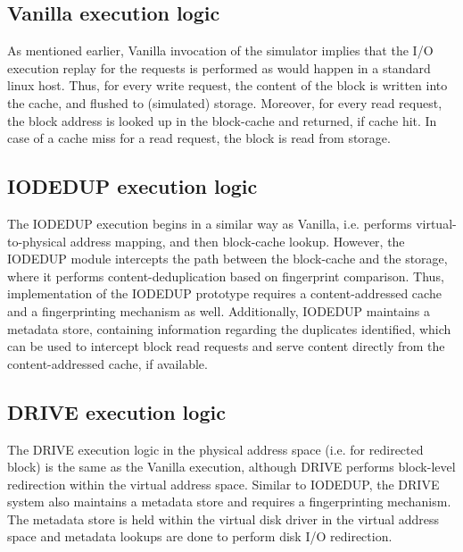 \subsection{Vanilla execution logic}
As mentioned earlier, Vanilla invocation of the simulator implies that
the I/O execution replay for the requests is performed as would happen
in a standard linux host. Thus, for every write request, the content of
the block is written into the cache, and flushed to (simulated) storage. 
Moreover, for every read request, the block address is looked up in the
block-cache and returned, if cache hit. In case of a cache miss for a
read request, the block is read from storage.

\subsection{IODEDUP execution logic}
The IODEDUP execution begins in a similar way as Vanilla, i.e. 
performs virtual-to-physical address mapping, and then block-cache lookup.
However, the IODEDUP module intercepts the path between the block-cache
and the storage, where it performs content-deduplication based on 
fingerprint comparison. Thus, implementation of the IODEDUP prototype requires 
a content-addressed cache and a fingerprinting mechanism as well.
Additionally, IODEDUP maintains a metadata store, containing 
information regarding the duplicates identified, which can be used 
to intercept block read requests and serve content directly from the
content-addressed cache, if available.

\subsection{DRIVE execution logic}
The DRIVE execution logic in the physical address space (i.e. for redirected
block) is the same as the Vanilla execution, although DRIVE performs block-level
redirection within the virtual address space. Similar to IODEDUP, the
DRIVE system also maintains a metadata store and requires a fingerprinting
mechanism. The metadata store is held within the virtual disk driver in
the virtual address space and metadata lookups are done to perform
disk I/O redirection. %



